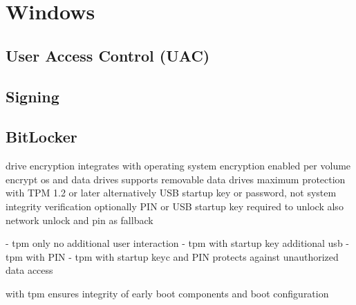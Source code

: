 
\section{Windows}
\subsection{User Access Control (UAC)}
\subsection{Signing}
\subsection{BitLocker}


drive encryption integrates with operating system
encryption enabled per volume
encrypt os and data drives
supports removable data drives
maximum protection with TPM 1.2 or later
alternatively USB startup key or password, not system integrity verification
optionally PIN or USB startup key required to unlock
also network unlock and pin as fallback

- tpm only
no additional user interaction
- tpm with startup key
additional usb
- tpm with PIN
- tpm with startup keyc and PIN
protects against unauthorized data access

with tpm ensures integrity of early boot components and boot configuration


